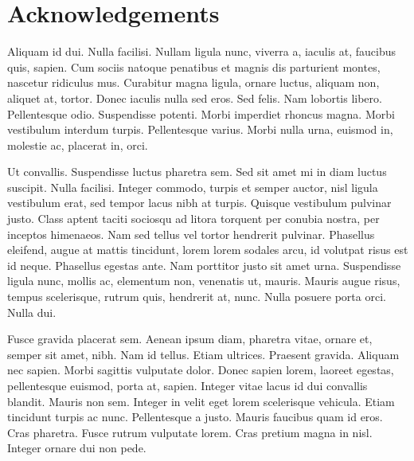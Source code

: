 \chapter*{Acknowledgements}

Aliquam id dui. Nulla facilisi. Nullam ligula nunc, viverra a, iaculis
at, faucibus quis, sapien. Cum sociis natoque penatibus et magnis dis
parturient montes, nascetur ridiculus mus. Curabitur magna ligula,
ornare luctus, aliquam non, aliquet at, tortor. Donec iaculis nulla
sed eros. Sed felis. Nam lobortis libero. Pellentesque
odio. Suspendisse potenti. Morbi imperdiet rhoncus magna. Morbi
vestibulum interdum turpis. Pellentesque varius. Morbi nulla urna,
euismod in, molestie ac, placerat in, orci. 

Ut convallis. Suspendisse luctus pharetra sem. Sed sit amet mi in diam
luctus suscipit. Nulla facilisi. Integer commodo, turpis et semper
auctor, nisl ligula vestibulum erat, sed tempor lacus nibh at
turpis. Quisque vestibulum pulvinar justo. Class aptent taciti
sociosqu ad litora torquent per conubia nostra, per inceptos
himenaeos. Nam sed tellus vel tortor hendrerit pulvinar. Phasellus
eleifend, augue at mattis tincidunt, lorem lorem sodales arcu, id
volutpat risus est id neque. Phasellus egestas ante. Nam porttitor
justo sit amet urna. Suspendisse ligula nunc, mollis ac, elementum
non, venenatis ut, mauris. Mauris augue risus, tempus scelerisque,
rutrum quis, hendrerit at, nunc. Nulla posuere porta orci. Nulla dui. 

Fusce gravida placerat sem. Aenean ipsum diam, pharetra vitae, ornare
et, semper sit amet, nibh. Nam id tellus. Etiam ultrices. Praesent
gravida. Aliquam nec sapien. Morbi sagittis vulputate dolor. Donec
sapien lorem, laoreet egestas, pellentesque euismod, porta at,
sapien. Integer vitae lacus id dui convallis blandit. Mauris non
sem. Integer in velit eget lorem scelerisque vehicula. Etiam tincidunt
turpis ac nunc. Pellentesque a justo. Mauris faucibus quam id
eros. Cras pharetra. Fusce rutrum vulputate lorem. Cras pretium magna
in nisl. Integer ornare dui non pede. 

\vspace{10mm}
